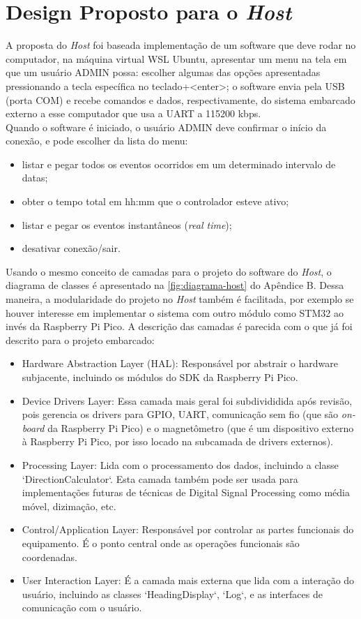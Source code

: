 \documentclass[10pt,twocolumn,letterpaper]{article}
\begin{document}
\section{Design Proposto para o \emph{Host}}
A proposta do \emph{Host} foi baseada implementação de um software que deve rodar no computador, na máquina 
virtual WSL Ubuntu, apresentar um menu na tela em que um usuário ADMIN possa: escolher algumas das opções 
apresentadas pressionando a tecla específica no teclado+<enter>; o software envia pela USB (porta COM) e recebe
comandos e dados, respectivamente, do sistema embarcado externo a esse computador que usa a UART a 115200 kbps.\\
Quando o software é iniciado, o usuário ADMIN deve confirmar o início da conexão, e pode escolher da lista do menu: 
\begin{itemize}
  \item listar e pegar todos os eventos ocorridos em um determinado intervalo de datas; 
  \item obter o tempo total em hh:mm que o controlador esteve ativo;
  \item listar e pegar os eventos instantâneos (\emph{real time});
  \item desativar conexão/sair.
\end{itemize}

Usando o mesmo conceito de camadas para o projeto do software do \emph{Host}, o diagrama de classes é apresentado na \autoref{fig:diagrama-host} do Apêndice B. 
Dessa maneira, a modularidade do projeto no \emph{Host} também é facilitada, por exemplo se houver interesse em implementar o sistema com outro módulo como STM32 ao invés da Raspberry Pi Pico. 
A descrição das camadas é parecida com o que já foi descrito para o projeto embarcado:
\begin{itemize}
  \item Hardware Abstraction Layer (HAL): Responsável por abstrair o hardware subjacente, incluindo os módulos do SDK da Raspberry Pi Pico.
  \item Device Drivers Layer: Essa camada mais geral foi subdivididida após revisão, pois gerencia os drivers para GPIO, UART, comunicação sem fio (que são \emph{on-board} da Raspberry Pi Pico) e o magnetômetro (que é um dispositivo externo à Raspberry Pi Pico, por isso locado na subcamada de drivers externos).
  \item Processing Layer: Lida com o processamento dos dados, incluindo a classe `DirectionCalculator`. Esta camada também pode ser usada 
  para implementações futuras de técnicas de Digital Signal Processing como média móvel, dizimação, etc.
  \item Control/Application Layer: Responsável por controlar as partes funcionais do equipamento. É o ponto central onde as operações 
  funcionais são coordenadas. 
  \item User Interaction Layer: É a camada mais externa que lida com a interação do usuário, incluindo as classes `HeadingDisplay`, `Log`, 
  e as interfaces de comunicação com o usuário.
\end{itemize}
\end{document}
